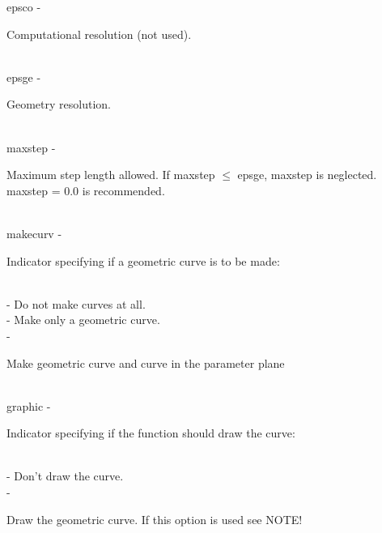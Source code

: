         \>\>    {\fov epsco}\> - \>     \begin{minipg2}
                                Computational resolution (not used).
                                \end{minipg2}\\
        \>\>    {\fov epsge}\> - \>     \begin{minipg2}
                                Geometry resolution.
                                \end{minipg2}\\
        \>\>    {\fov maxstep}\> - \>   \begin{minipg2}
                                Maximum step length allowed. If maxstep $\leq$ epsge,
                                maxstep is neglected. maxstep = 0.0 is recommended.
                                \end{minipg2}\\[0.8ex]
        \>\>    {\fov makecurv}\> - \>          \begin{minipg2}
                                Indicator specifying if a geometric curve is to be made:
                                \end{minipg2}\\
                \>\>\>\> -     \>Do not make curves at all.\\
                \>\>\>\> -     \>Make only a geometric curve.\\
                \>\>\>\> -     \>\begin{minipg5}
                                        Make geometric curve and curve in the parameter
                                        plane
                                        \end{minipg5} \\[0.3ex]
        \>\>    {\fov graphic}\> - \>   \begin{minipg2}
                                Indicator specifying if the function
                                should draw the curve:
                                \end{minipg2}\\
                \>\>\>\> -     \>Don't draw the curve.\\
                \>\>\>\> -     \>\begin{minipg5}
                                        Draw the geometric curve. If this option
                                        is used see NOTE!
                                        \end{minipg5} \\[0.8ex]
